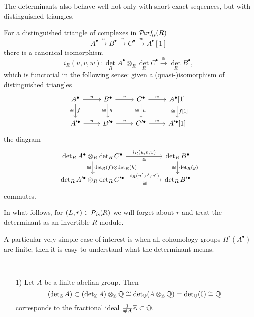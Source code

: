 \documentclass{article}
\numberwithin{equation}{section}
\begin{document}
\begin{appendices}
The determinants also behave well not only with short exact sequences, but with
distinguished triangles.

\begin{proposition}
  \label{prop:det-and-isos-of-triangles}
  For a distinguished triangle of complexes in $\mathcal{P}\!\text{\it arf}_{\text{\it is}} (R)$
  \[ A^\bullet \xrightarrow{u} B^\bullet \xrightarrow{v} C^\bullet
    \xrightarrow{w} A^\bullet [1] \]
  there is a canonical isomorphism
  \[ i_R (u,v,w)\colon \det_R A^\bullet \otimes_R \det_R C^\bullet
    \xrightarrow{\cong} \det_R B^\bullet, \]
  which is functorial in the following sense: given a (quasi-)isomorphism of
  distinguished triangles
  \[ \begin{tikzcd}
      A^\bullet \ar{r}{u}\ar{d}{f}[swap]{\cong} & B^\bullet \ar{r}{v}\ar{d}{g}[swap]{\cong} & C^\bullet \ar{r}{w}\ar{d}{h}[swap]{\cong} & A^\bullet [1]\ar{d}{f[1]}[swap]{\cong} \\
      A'^\bullet \ar{r}{u} & B'^\bullet \ar{r}{v} & C'^\bullet \ar{r}{w} & A'^\bullet [1]
    \end{tikzcd} \]
  the diagram
  \[ \begin{tikzcd}[column sep=5em]
      \det_R A^\bullet \otimes_R \det_R C^\bullet \ar{r}{i_R (u,v,w)}[swap]{\cong}\ar{d}{\det_R (f) \otimes \det_R (h)}[swap]{\cong} & \det_R B^\bullet\ar{d}{\det_R (g)}[swap]{\cong} \\
      \det_R A'^\bullet \otimes_R \det_R C'^\bullet \ar{r}{i_R (u',v',w')}[swap]{\cong} & \det_R B'^\bullet
    \end{tikzcd} \]
  commutes.
\end{proposition}

\begin{remark}
  In what follows, for $(L,r) \in \mathcal{P}_{\text{\it is}} (R)$ we will forget about
  $r$ and treat the determinant as an invertible $R$-module.
\end{remark}

A particular very simple case of interest is when all cohomology groups
$H^i (A^\bullet)$ are finite; then it is easy to understand what the determinant
means.

\begin{lemma}
  \label{lemma:determinant-for-torsion-cohomology}
  ~

  \begin{enumerate}
  \item[1)] Let $A$ be a finite abelian group. Then
    \[ (\operatorname{det}_{\mathbb{Z}} A) \subset (\operatorname{det}_{\mathbb{Z}} A) \otimes_{\mathbb{Z}} \mathbb{Q}
      \cong \operatorname{det}_{\mathbb{Q}} (A \otimes_{\mathbb{Z}} \mathbb{Q}) = \operatorname{det}_{\mathbb{Q}} (0) \cong \mathbb{Q} \]
    corresponds to the fractional ideal $\frac{1}{\# A} \mathbb{Z} \subset \mathbb{Q}$.


\end{enumerate}
\end{lemma}
\end{appendices}
\end{document}
